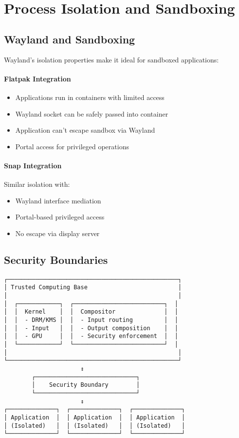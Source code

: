 \section{Process Isolation and Sandboxing}

\subsection{Wayland and Sandboxing}

Wayland's isolation properties make it ideal for sandboxed applications:

\paragraph{Flatpak Integration}

\begin{itemize}
    \item Applications run in containers with limited access
    \item Wayland socket can be safely passed into container
    \item Application can't escape sandbox via Wayland
    \item Portal access for privileged operations
\end{itemize}

\paragraph{Snap Integration}

Similar isolation with:
\begin{itemize}
    \item Wayland interface mediation
    \item Portal-based privileged access
    \item No escape via display server
\end{itemize}

\subsection{Security Boundaries}

\begin{verbatim}
┌─────────────────────────────────────────────────┐
│ Trusted Computing Base                          │
│                                                 │
│  ┌────────────┐  ┌──────────────────────────┐  │
│  │  Kernel    │  │  Compositor              │  │
│  │  - DRM/KMS │  │  - Input routing         │  │
│  │  - Input   │  │  - Output composition    │  │
│  │  - GPU     │  │  - Security enforcement  │  │
│  └────────────┘  └──────────────────────────┘  │
│                                                 │
└─────────────────────────────────────────────────┘
                      ↕
        ┌─────────────────────────────┐
        │    Security Boundary        │
        └─────────────────────────────┘
                      ↕
┌──────────────┐  ┌──────────────┐  ┌──────────────┐
│ Application  │  │ Application  │  │ Application  │
│ (Isolated)   │  │ (Isolated)   │  │ (Isolated)   │
└──────────────┘  └──────────────┘  └──────────────┘
\end{verbatim}

